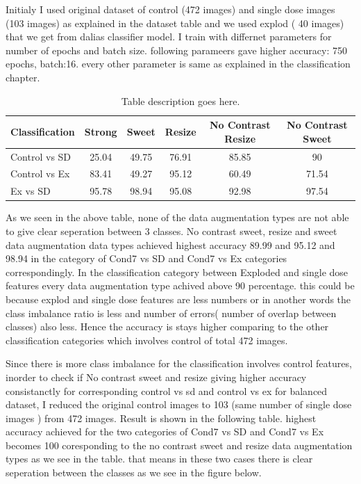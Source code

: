 Initialy I used original dataset of control (472 images) and single dose images (103 images) as explained in the dataset table and we used explod ( 40 images) that we get from dalias classifier model.
I train with differnet parameters for  number of epochs and batch size. following parameers gave higher accuracy: 750 epochs, batch:16. every other parameter is same as explained in the classification chapter.


\begin{table}[H]
  \centering
  \begin{tabular}{@{}lccccc@{}}
  \toprule
  \textbf{Classification} & \textbf{Strong} & \textbf{Sweet} & \textbf{Resize} & \textbf{No Contrast Resize} & \textbf{No Contrast Sweet} \\ \midrule
  Control vs SD             & 25.04            & 49.75           & 76.91          & 85.85                         & 90                        \\
  Control vs Ex             & 83.41            & 49.27               & 95.12           & 60.49                          &    71.54                 \\
  Ex vs SD                & 95.78           & 98.94          & 95.08           & 92.98                       & 97.54                        \\ \bottomrule
  \end{tabular}
  \caption{Table description goes here.}
  \label{tab:ranking softmax}
\end{table}

As we seen in the above table, none of the  data augmentation types are not able to give clear seperation between 3 classes. No contrast sweet, resize and sweet data augmentation data types achieved highest accuracy 89.99 and 95.12 and 98.94  in the category of  Cond7 vs SD and Cond7 vs Ex categories correspondingly. In the classification category between Exploded and single dose features every data augmentation type achived above 90 percentage. this could be because explod and single dose features are less numbers or in another words the class imbalance ratio is less and number of errors( number of overlap between classes) also less. Hence the accuracy is stays higher comparing to the other classification categories which involves control of total 472 images.


Since there is more class imbalance for the classification involves control features, inorder to check if No contrast sweet and resize  giving higher accuracy consistanctly for corresponding control vs sd and control vs ex for balanced dataset, I reduced the original control images to 103 (same number of single dose images ) from 472 images. Result is shown in the following table. highest accuracy achieved for the two categories of Cond7 vs SD and Cond7 vs Ex becomes 100 coresponding to the no contrast sweet and resize  data augmentation types as we see in the table. that means in these two cases there is clear seperation between the classes as we see in the figure below.

